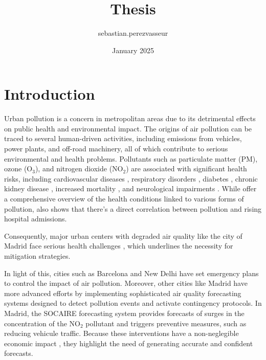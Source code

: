 \documentclass[12pt,a4paper]{book}
\title{Thesis}
\author{sebastian.perezvasseur}
\date{January 2025}
\begin{document}
\newcommand{\no}{NO$_{2}$}
\newcommand{\ot}{O$_{3}$}
\newcommand{\pmtwo}{PM$_{2.5}$}
\newcommand{\pmten}{PM$_{10}$}

\frontmatter

\cleardoublepage{}

\tableofcontents
\listoffigures
\renewcommand{\listtablename}{List of tables}
\listoftables

\mainmatter

\chapter{Introduction}

Urban pollution is a concern in metropolitan areas due to its detrimental effects on public health and environmental impact. The origins of air pollution can be traced to several human-driven activities, including emissions from vehicles, power plants, and off-road machinery, all of which contribute to serious environmental and health problems. Pollutants such as particulate matter (PM), ozone (\ot), and nitrogen dioxide (\no) are associated with significant health risks, including cardiovascular diseases \citep{lee_air_2014}, respiratory disorders \citep{kurt_pulmonary_2016}, diabetes \citep{eze_long-term_2014}, chronic kidney disease \citep{bowe_particulate_2018}, increased mortality \citep{tang_mortality_2017}, and neurological impairments \citep{lee_traffic-related_2016}. While \citet{landrigan_pollution_2018} offer a comprehensive overview of the health conditions linked to various forms of pollution, \citet{NAVARES2020109254} also shows that there's a direct correlation between pollution and rising hospital admissions.

Consequently, major urban centers with degraded air quality like the city of Madrid \citep{gonzalez-garcia_environmental_2021} face serious health challenges \citep{aguilar_relationship_2021}, which underlines the necessity for mitigation strategies.

In light of this, cities such as Barcelona \citep{barcelonamesaure} and New Delhi \citep{newdelhimeasure} have set emergency plans to control the impact of air pollution. Moreover, other cities like Madrid have more advanced efforts by implementing sophisticated air quality forecasting systems designed to detect pollution events and activate contingency protocols. In Madrid, the SOCAIRE forecasting system \citep{de_medrano_socaire_2021} provides forecasts of surges in the concentration of the \no{} pollutant and triggers preventive measures, such as reducing vehicule traffic. Because these interventions have a non-neglegible economic impact \citep{madrid_protocolo_no}, they highlight the need of generating accurate and confident forecasts.
\end{document}
